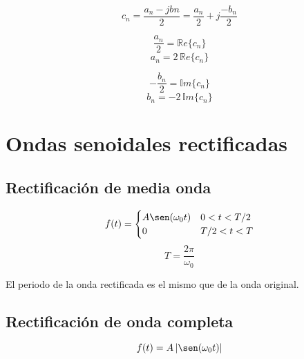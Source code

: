 \begin{equation*}
    c_n=\frac{a_n-jbn}{2}
        =\frac{a_n}{2}+j\frac{-b_n}{2}
\end{equation*}

\begin{equation*}
    \frac{a_n}{2}=\mathbb{R}e\{c_n\}
\end{equation*}
\begin{equation}
    a_n=2\,\mathbb{R}e\{c_n\}
\end{equation}

\begin{equation*}
    -\frac{b_n}{2}=\mathbb{I}m\{c_n\}
\end{equation*}
\begin{equation}
    b_n=-2\,\mathbb{I}m\{c_n\}
\end{equation}

\section{Ondas senoidales rectificadas}

\subsection{Rectificación de media onda}

\begin{equation*}
    f(t)=\begin{cases}
        A\sen(\omega_0 t) & 0<t<T/2\\
        0                 & T/2<t<T\\
    \end{cases}
\end{equation*}
\begin{equation*}
    T=\frac{2\pi}{\omega_0}
\end{equation*}

\begin{figure}[H]
    \centering
    
\end{figure}

El periodo de la onda rectificada es el mismo que de la onda original.

\subsection{Rectificación de onda completa}

\begin{equation*}
    f(t)=A\,|\sen(\omega_0 t)|
\end{equation*}

